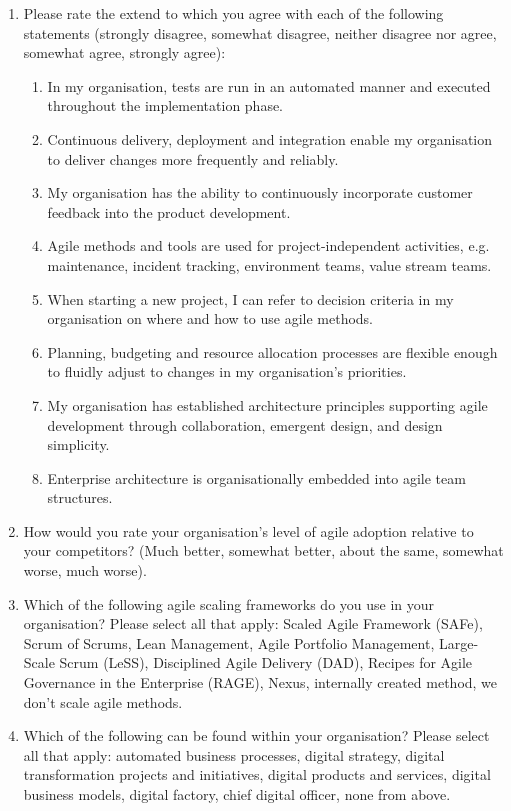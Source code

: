 \documentclass{article}
\begin{document}
\begin{enumerate}
    \item Please rate the extend to which you agree with each of the following statements (strongly disagree, somewhat disagree, neither disagree nor agree, somewhat agree, strongly agree):
    \begin{enumerate}
        \item In my organisation, tests are run in an automated manner and executed throughout the implementation phase.
        \item Continuous delivery, deployment and integration enable my organisation to deliver changes more frequently and reliably.
        \item My organisation has the ability to continuously incorporate customer feedback into the product development.
        \item Agile methods and tools are used for project-independent activities, e.g. maintenance, incident tracking, environment teams, value stream teams.
        \item When starting a new project, I can refer to decision criteria in my organisation on where and how to use agile methods.
        \item Planning, budgeting and resource allocation processes are flexible enough to fluidly adjust to changes in my organisation’s priorities.
        \item My organisation has established architecture principles supporting agile development through collaboration, emergent design, and design simplicity.
        \item Enterprise architecture is organisationally embedded into agile team structures.
    \end{enumerate}
    \item How would you rate your organisation's level of agile adoption relative to your competitors? (Much better, somewhat better, about the same, somewhat worse, much worse).
    \item Which of the following agile scaling frameworks do you use in your organisation? Please select all that apply: Scaled Agile Framework (SAFe), Scrum of Scrums, Lean Management, Agile Portfolio Management, Large-Scale Scrum (LeSS), Disciplined Agile Delivery (DAD), Recipes for Agile Governance in the Enterprise (RAGE), Nexus, internally created method, we don't scale agile methods.
    \item Which of the following can be found within your organisation? Please select all that apply: automated business processes, digital strategy, digital transformation projects and initiatives, digital products and services, digital business models, digital factory, chief digital officer, none from above.

\end{enumerate}
\end{document}
